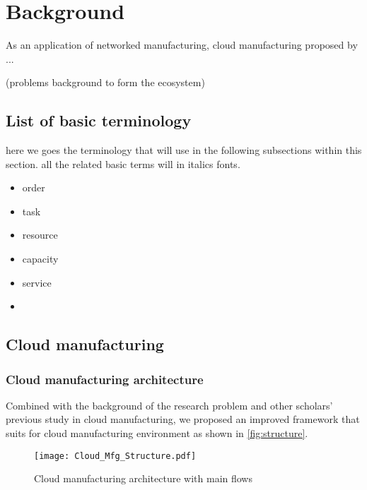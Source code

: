 \section{Background} %
\label{sec:background}

As an application of networked manufacturing, cloud manufacturing proposed by ...

(problems background to form the ecosystem)

\subsection{List of basic terminology} %
\label{sub:list_of_basic_terminology}
here we goes the terminology that will use in the following subsections within this section. all the related basic terms will in italics fonts.
\begin{itemize}
	\item order
	\item task
	\item resource
	\item capacity
	\item service
	\item 
\end{itemize}

\subsection{Cloud manufacturing} %
\label{sub:cloud_manufacturing}

\subsubsection{Cloud manufacturing architecture}
\label{subs:cloud manufacturing architecture}
Combined with the background of the research problem and other scholars' previous study in cloud manufacturing, we proposed an improved framework that suits for cloud manufacturing environment as shown in \autoref{fig:structure}.
\begin{figure}[htbp]
\centering
\texttt{[image: Cloud\_Mfg\_Structure.pdf]}
\caption{Cloud manufacturing architecture with main flows}
\label{fig:structure}
\end{figure}

